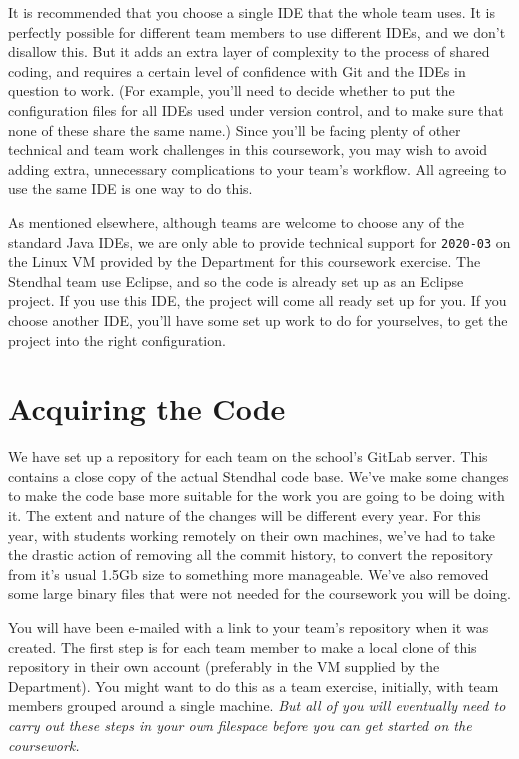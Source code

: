 \documentclass[
]{book}
\begin{document}
It is recommended that you choose a single IDE that the whole team uses. It is perfectly possible for different team members to use different IDEs, and we don't disallow this. But it adds an extra layer of complexity to the process of shared coding, and requires a certain level of confidence with Git and the IDEs in question to work. (For example, you'll need to decide whether to put the configuration files for all IDEs used under version control, and to make sure that none of these share the same name.) Since you'll be facing plenty of other technical and team work challenges in this coursework, you may wish to avoid adding extra, unnecessary complications to your team's workflow. All agreeing to use the same IDE is one way to do this.

As mentioned elsewhere, although teams are welcome to choose any of the standard Java IDEs, we are only able to provide technical support for \texttt{2020-03} on the Linux VM provided by the Department for this coursework exercise. The Stendhal team use Eclipse, and so the code is already set up as an Eclipse project. If you use this IDE, the project will come all ready set up for you. If you choose another IDE, you'll have some set up work to do for yourselves, to get the project into the right configuration.

\hypertarget{acoding}{%
\section{Acquiring the Code}\label{acoding}}

We have set up a repository for each team on the school's GitLab server. This contains a close copy of the actual Stendhal code base. We've make some changes to make the code base more suitable for the work you are going to be doing with it. The extent and nature of the changes will be different every year. For this year, with students working remotely on their own machines, we've had to take the drastic action of removing all the commit history, to convert the repository from it's usual 1.5Gb size to something more manageable. We've also removed some large binary files that were not needed for the coursework you will be doing.

You will have been e-mailed with a link to your team's repository when it was created. The first step is for each team member to make a local clone of this repository in their own account (preferably in the VM supplied by the Department). You might want to do this as a team exercise, initially, with team members grouped around a single machine. \emph{But all of you will eventually need to carry out these steps in your own filespace before you can get started on the coursework.}
\end{document}

